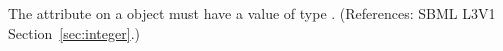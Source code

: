 The attribute  on a \Unit object must have a value of type
.  (References: SBML L3V1 Section~\ref{sec:integer}.)
